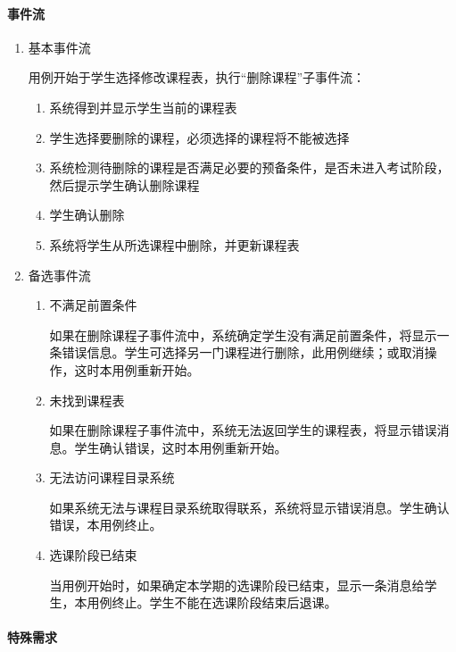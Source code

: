 \paragraph{事件流}
  \begin{enumerate}
    \item 基本事件流
    
    用例开始于学生选择修改课程表，执行“删除课程”子事件流：
    \begin{enumerate}[(1)]
      \item 系统得到并显示学生当前的课程表
      \item 学生选择要删除的课程，必须选择的课程将不能被选择
      \item 系统检测待删除的课程是否满足必要的预备条件，是否未进入考试阶段，然后提示学生确认删除课程
      \item 学生确认删除
      \item 系统将学生从所选课程中删除，并更新课程表
    \end{enumerate}
    
    \item 备选事件流
    
    \begin{enumerate}[(1)]
      \item 不满足前置条件
      
      \CJKindent 如果在删除课程子事件流中，系统确定学生没有满足前置条件，将显示一条错误信息。学生可选择另一门课程进行删除，此用例继续；或取消操作，这时本用例重新开始。
      
      \item 未找到课程表
      
      \CJKindent 如果在删除课程子事件流中，系统无法返回学生的课程表，将显示错误消息。学生确认错误，这时本用例重新开始。

      \item 无法访问课程目录系统
      
      \CJKindent 如果系统无法与课程目录系统取得联系，系统将显示错误消息。学生确认错误，本用例终止。
      
      \item 选课阶段已结束
      
      \CJKindent 当用例开始时，如果确定本学期的选课阶段已结束，显示一条消息给学生，本用例终止。学生不能在选课阶段结束后退课。
    \end{enumerate}
  \end{enumerate}
  
\paragraph{特殊需求}
  
